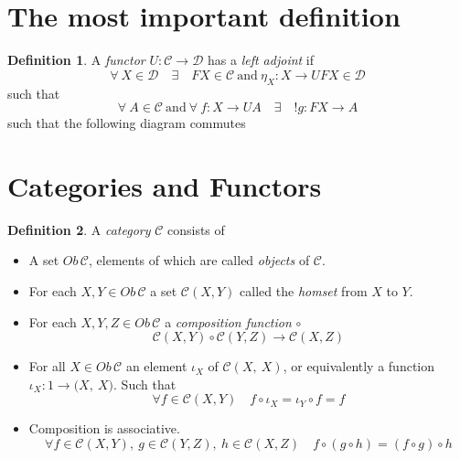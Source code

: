 \documentclass{article}
\theoremstyle{definition}
\newtheorem{definition}{Definition}[section]
\begin{document}
\section{The most important definition}
\begin{definition}
	A \textit{functor} $U : \mathcal{C} \rightarrow \mathcal{D}$ has a \textit{left adjoint} if
		$$
		\forall\ X \in \mathcal{D}
		\quad\exists\quad
		FX \in \mathcal{C} \ \textrm{and}\ \eta_X : X \rightarrow UFX \in \mathcal{D}
		$$
		such that
		$$
		\forall\ A \in \mathcal{C}\ \textrm{and}\ \forall\ f : X \rightarrow UA
		\quad\exists\quad
		!g : FX \rightarrow A
		$$
		such that the following diagram commutes
\end{definition}

\begin{center}
\end{center}

\section{Categories and Functors}

\begin{definition}
	A \textit{category} $\mathcal{C}$ consists of
	\begin{itemize}
		\item A set $Ob\,\mathcal{C}$, elements of which are called \textit{objects} of $\mathcal{C}$.
		\item For each $X, Y \in Ob\,\mathcal{C}$
			a set $\mathcal{C}(X,Y)$ called the \textit{homset} from $X$ to $Y$.
		\item For each $X, Y, Z \in Ob\,\mathcal{C}$ a \textit{composition function} $\circ$
			$$\mathcal{C}(X,Y) \circ \mathcal{C}(Y,Z) \rightarrow \mathcal{C}(X,Z)$$
		\item For all $X \in Ob\,\mathcal{C}$ an element $\iota_X$ of $\mathcal{C}(X,\ X)$,
			or equivalently a function $\iota_X : 1 \rightarrow \mathcal(X,\ X)$.
			Such that
			$$\forall f \in \mathcal{C}(X,Y)\quad f \circ \iota_X = \iota_Y \circ f = f$$
		\item Composition is associative.
			$$\forall
			f \in \mathcal{C}(X,Y),\ 
			g \in \mathcal{C}(Y,Z),\ 
			h \in \mathcal{C}(X,Z)\quad
			f \circ (g \circ h) = (f \circ g) \circ h
			$$
			\begin{center}
			\end{center}
	\end{itemize}
\end{definition}
\end{document}
